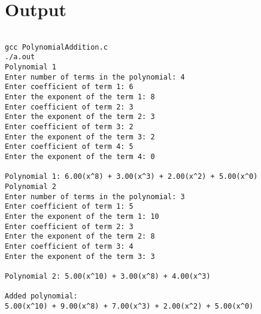 \documentclass{article}
\begin{document}
\section*{Output}
\begin{verbatim}

gcc PolynomialAddition.c
./a.out
Polynomial 1
Enter number of terms in the polynomial: 4
Enter coefficient of term 1: 6
Enter the exponent of the term 1: 8
Enter coefficient of term 2: 3
Enter the exponent of the term 2: 3
Enter coefficient of term 3: 2
Enter the exponent of the term 3: 2
Enter coefficient of term 4: 5
Enter the exponent of the term 4: 0

Polynomial 1: 6.00(x^8) + 3.00(x^3) + 2.00(x^2) + 5.00(x^0)
Polynomial 2
Enter number of terms in the polynomial: 3
Enter coefficient of term 1: 5
Enter the exponent of the term 1: 10
Enter coefficient of term 2: 3
Enter the exponent of the term 2: 8
Enter coefficient of term 3: 4
Enter the exponent of the term 3: 3

Polynomial 2: 5.00(x^10) + 3.00(x^8) + 4.00(x^3)

Added polynomial:
5.00(x^10) + 9.00(x^8) + 7.00(x^3) + 2.00(x^2) + 5.00(x^0)

\end{verbatim}
\end{document}
